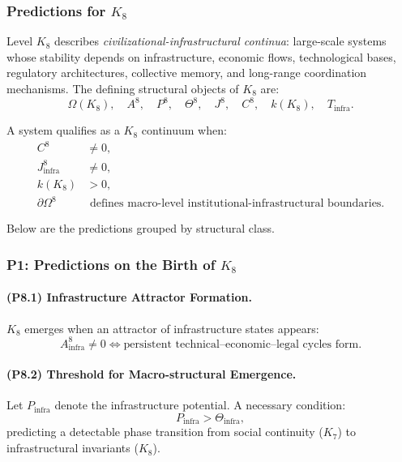 

\subsubsection{Predictions for \texorpdfstring{$K_8$}{K_8}}
\label{sec:predictions-k8}

Level $K_8$ describes \emph{civilizational-infrastructural continua}: 
large-scale systems whose stability depends on infrastructure, 
economic flows, technological bases, regulatory architectures, 
collective memory, and long-range coordination mechanisms.  
The defining structural objects of $K_8$ are:
\[
\Omega(K_8),\quad A^{8},\quad P^{8},\quad \Theta^{8},\quad 
J^{8},\quad C^{8},\quad k(K_8),\quad T_{\mathrm{infra}}.
\]

A system qualifies as a $K_8$ continuum when:
\[
\begin{aligned}
C^{8} &\neq 0,\\
J^{8}_{\mathrm{infra}} &\neq 0,\\
k(K_8) &> 0,\\
\partial\Omega^{8} &\text{ defines macro-level institutional-infrastructural boundaries.}
\end{aligned}
\]

Below are the predictions grouped by structural class.

\subsubsection{P1: Predictions on the Birth of \texorpdfstring{$K_8$}{K_8}}

\paragraph{(P8.1) Infrastructure Attractor Formation.}
$K_8$ emerges when an attractor of infrastructure states appears:
\[
A_{\mathrm{infra}}^8 \neq 0 
\iff 
\text{persistent technical–economic–legal cycles form}.
\]

\paragraph{(P8.2) Threshold for Macro-structural Emergence.}
Let $P_{\mathrm{infra}}$ denote the infrastructure potential.  
A necessary condition:
\[
P_{\mathrm{infra}} > \Theta_{\mathrm{infra}},
\]
predicting a detectable phase transition from social continuity ($K_7$) 
to infrastructural invariants ($K_8$).

